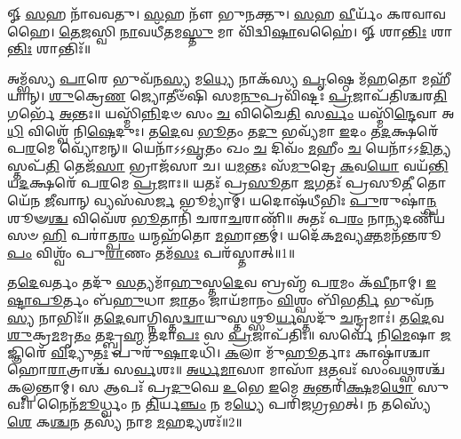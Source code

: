 \setcounter{anuvakam}{0}
𑍐 \ul{𑌸}\-𑌹 𑌨𑌾᳴𑌵𑌵𑌤𑍁। 
\-\ul{𑌸}\-𑌹 𑌨𑍗᳴ 𑌭𑍁𑌨𑌕𑍍𑌤𑍁। 
\-\ul{𑌸}\-𑌹 \ul{𑌵𑍀}\-𑌰𑍍𑌯𑌂᳴ 𑌕𑌰𑌵𑌾𑌵𑌹𑍈। 
\-\ul{𑌤𑍇}\-\-\ul{𑌜}\-𑌸𑍍𑌵𑌿 \ul{𑌨𑌾}\-𑌵𑌧𑍀᳴𑌤𑌮\-\ul{𑌸𑍍𑌤𑍁} 𑌮𑌾 𑌵𑌿᳴𑌦𑍍𑌵𑌿\-\ul{𑌷𑌾}\-𑌵𑌹𑍈॑। 
𑍐 𑌶𑌾\-\ul{𑌨𑍍𑌤𑌿𑌃} 𑌶𑌾\-\ul{𑌨𑍍𑌤𑌿𑌃} 𑌶𑌾𑌨𑍍𑌤𑌿𑌃᳴॥

𑌅𑌮𑍍𑌭᳴𑌸𑍍𑌯 \ul{𑌪𑌾}\-𑌰𑍇 𑌭𑍁𑌵᳴𑌨\-\ul{𑌸𑍍𑌯} 𑌮\-\ul{𑌧𑍍𑌯𑍇} 𑌨𑌾𑌕᳴𑌸𑍍𑌯 \ul{𑌪𑍃}\-𑌷𑍍𑌠𑍇 𑌮᳴\-\ul{𑌹}\-𑌤𑍋 𑌮𑌹𑍀᳴𑌯𑌾𑌨𑍍। 
\-\ul{𑌶𑍁}\-𑌕𑍍𑌰𑍇\-\ul{𑌣} 𑌜𑍍𑌯𑍋𑌤𑍀𑍞᳴𑌷𑌿 𑌸𑌮\-\ul{𑌨𑍁}\-𑌪𑍍𑌰𑌵𑌿᳴𑌷𑍍𑌟𑌃 \ul{𑌪𑍍𑌰}\-𑌜𑌾𑌪᳴𑌤𑌿𑌶𑍍𑌚𑌰\-\ul{𑌤𑌿} 𑌗𑌰𑍍𑌭𑍇᳴ \ul{𑌅}\-𑌨𑍍𑌤𑌃॥ 
𑌯𑌸𑍍𑌮𑌿᳴\-\ul{𑌨𑍍𑌨𑌿}\-𑌦𑍞 𑌸𑌂 \ul{𑌚} 𑌵𑌿𑌚𑍈\-\ul{𑌤𑌿} 𑌸\-\ul{𑌰𑍍𑌵𑌂} 𑌯𑌸𑍍𑌮𑌿᳴\-\ul{𑌨𑍍𑌦𑍇}\-𑌵𑌾 𑌅\-\ul{𑌧𑌿} 𑌵𑌿𑌶𑍍𑌵𑍇᳴ 𑌨𑌿\-\ul{𑌷𑍇}\-𑌦𑍁𑌃। 
𑌤\-\ul{𑌦𑍇}\-𑌵 \ul{𑌭𑍂}\-𑌤𑌂 𑌤\-\ul{𑌦𑍁} 𑌭𑌵𑍍𑌯᳴𑌮𑌾 \ul{𑌇}\-𑌦𑌂 𑌤\-\ul{𑌦}\-𑌕𑍍𑌷𑌰𑍇᳴ 𑌪\-\ul{𑌰}\-𑌮𑍇 𑌵𑍍𑌯𑍋᳴𑌮𑌨𑍍॥ 
𑌯𑍇𑌨𑌾᳴𑌽𑌽\-\ul{𑌵𑍃}\-𑌤𑌂 𑌖𑌂 \ul{𑌚} 𑌦𑌿𑌵𑌂᳴ \ul{𑌮}\-𑌹𑍀𑌂 \ul{𑌚} 𑌯𑍇𑌨𑌾᳴𑌽𑌽\-\ul{𑌦𑌿}\-𑌤𑍍𑌯𑌸𑍍𑌤𑌪᳴\-\ul{𑌤𑌿} 𑌤𑍇𑌜᳴\-\ul{𑌸𑌾} 𑌭𑍍𑌰𑌾𑌜᳴𑌸𑌾 𑌚। 
𑌯\-\ul{𑌮}\-𑌨𑍍𑌤𑌃 𑌸᳴\-\ul{𑌮𑍁}\-𑌦𑍍𑌰𑍇 \ul{𑌕}\-𑌵\-\ul{𑌯𑍋} 𑌵𑌯᳴\-\ul{𑌨𑍍𑌤𑌿} 𑌯\-\ul{𑌦}\-𑌕𑍍𑌷𑌰𑍇᳴ 𑌪\-\ul{𑌰}\-𑌮𑍇 \ul{𑌪𑍍𑌰}\-𑌜𑌾𑌃॥ 
𑌯𑌤𑌃᳴ 𑌪𑍍𑌰\-\ul{𑌸𑍂}\-𑌤𑌾 \ul{𑌜}\-𑌗𑌤𑌃᳴ 𑌪𑍍𑌰𑌸𑍂\-\ul{𑌤𑍀} 𑌤𑍋𑌯𑍇᳴𑌨 \ul{𑌜𑍀}\-𑌵𑌾𑌨𑍍 𑌵𑍍𑌯𑌸᳴𑌸\-\ul{𑌰𑍍𑌜} 𑌭𑍂𑌮𑍍𑌯𑌾॑𑌮𑍍। 
𑌯𑌦𑍋𑌷᳴𑌧𑍀𑌭𑌿𑌃 \ul{𑌪𑍁}\-𑌰𑍁𑌷𑌾॑\-\ul{𑌨𑍍𑌪}\-𑌶𑍂𑍟\-\ul{𑌶𑍍𑌚} 𑌵𑌿𑌵𑍇᳴𑌶 \ul{𑌭𑍂}\-𑌤𑌾𑌨𑌿᳴ 𑌚𑌰𑌾\-\ul{𑌚}\-𑌰𑌾𑌣𑌿᳴॥ 
𑌅𑌤𑌃᳴ 𑌪\-\ul{𑌰𑌂} 𑌨𑌾\-\ul{𑌨𑍍𑌯}\-𑌦𑌣𑍀᳴𑌯𑌸𑍞 \ul{𑌹𑌿} 𑌪𑌰𑌾॑𑌤𑍍𑌪\-\ul{𑌰𑌂} 𑌯𑌨𑍍𑌮𑌹᳴𑌤𑍋 \ul{𑌮}\-𑌹𑌾𑌨𑍍𑌤𑌮𑍍॑। 
𑌯𑌦𑍇᳴𑌕\-\ul{𑌮}\-𑌵𑍍𑌯\-\ul{𑌕𑍍𑌤}\-𑌮𑌨᳴𑌨𑍍𑌤𑌰𑍂\-\ul{𑌪𑌂} 𑌵𑌿𑌶𑍍𑌵𑌂᳴ 𑌪𑍁\-\ul{𑌰𑌾}\-𑌣𑌂 𑌤𑌮᳴\-\ul{𑌸𑌃} 𑌪𑌰᳴𑌸𑍍𑌤𑌾𑌤𑍍॥1॥

𑌤\-\ul{𑌦𑍇}\-𑌵𑌰𑍍𑌤𑌂 𑌤𑌦𑍁᳴ \ul{𑌸}\-𑌤𑍍𑌯𑌮𑌾᳴\-\ul{𑌹𑍁}\-𑌸𑍍𑌤\-\ul{𑌦𑍇}\-𑌵 𑌬𑍍𑌰𑌹𑍍𑌮᳴ 𑌪\-\ul{𑌰}\-𑌮𑌂 𑌕᳴\-\ul{𑌵𑍀}\-𑌨𑌾𑌮𑍍। 
\-\ul{𑌇}\-\-\ul{𑌷𑍍𑌟𑌾}\-\-\ul{𑌪𑍂}\-𑌰𑍍𑌤𑌂 𑌬᳴\-\ul{𑌹𑍁}\-𑌧𑌾 \ul{𑌜𑌾}\-𑌤𑌂 𑌜𑌾𑌯᳴𑌮𑌾𑌨𑌂 \ul{𑌵𑌿}\-𑌶𑍍𑌵𑌂 𑌬𑌿᳴𑌭\-\ul{𑌰𑍍𑌤𑌿} 𑌭𑍁𑌵᳴𑌨\-\ul{𑌸𑍍𑌯} 𑌨𑌾𑌭𑌿𑌃᳴॥ 
𑌤\-\ul{𑌦𑍇}\-𑌵𑌾𑌗𑍍𑌨𑌿𑌸𑍍𑌤\-\ul{𑌦𑍍𑌵𑌾}\-𑌯𑍁𑌸𑍍𑌤𑌥𑍍𑌸𑍂\-\ul{𑌰𑍍𑌯}\-𑌸𑍍𑌤𑌦𑍁᳴ \ul{𑌚}\-𑌨𑍍𑌦𑍍𑌰𑌮𑌾𑌃॑। 
𑌤\-\ul{𑌦𑍇}\-𑌵 \ul{𑌶𑍁}\-𑌕𑍍𑌰\-\ul{𑌮}\-𑌮𑍃\-\ul{𑌤𑌂} 𑌤𑌦𑍍𑌬𑍍𑌰\-\ul{𑌹𑍍𑌮} 𑌤𑌦𑌾\-\ul{𑌪𑌃} 𑌸 \ul{𑌪𑍍𑌰}\-𑌜𑌾𑌪᳴𑌤𑌿𑌃॥ 
𑌸𑌰𑍍𑌵𑍇᳴ 𑌨𑌿\-\ul{𑌮𑍇}\-𑌷𑌾 \ul{𑌜}\-𑌜𑍍𑌞𑌿𑌰𑍇᳴ \ul{𑌵𑌿}\-𑌦𑍍𑌯𑍁\-\ul{𑌤𑌃} 𑌪𑍁𑌰𑍁᳴\-\ul{𑌷𑌾}\-𑌦𑌧𑌿᳴। 
\-\ul{𑌕}\-𑌲𑌾 𑌮𑍁᳴\-\ul{𑌹𑍂}\-𑌰𑍍𑌤𑌾𑌃 𑌕𑌾𑌷𑍍𑌠𑌾॑𑌶𑍍𑌚𑌾𑌹𑍋\-\ul{𑌰𑌾}\-𑌤𑍍𑌰𑌾𑌶𑍍𑌚᳴ 𑌸\-\ul{𑌰𑍍𑌵}\-𑌶𑌃॥ 
\-\ul{𑌅}\-\-\ul{𑌰𑍍𑌧}\-\-\ul{𑌮𑌾}\-𑌸𑌾 𑌮𑌾𑌸𑌾᳴ \ul{𑌋}\-𑌤𑌵𑌃᳴ 𑌸𑌂𑌵\-\ul{𑌥𑍍𑌸}\-𑌰𑌶𑍍𑌚᳴ 𑌕𑌲𑍍𑌪𑌨𑍍𑌤𑌾𑌮𑍍। 
𑌸 𑌆𑌪𑌃᳴ 𑌪𑍍𑌰\-\ul{𑌦𑍁}\-𑌘𑍇 \ul{𑌉}\-𑌭𑍇 \ul{𑌇}\-𑌮𑍇 \ul{𑌅}\-𑌨𑍍𑌤𑌰𑌿᳴\-\ul{𑌕𑍍𑌷}\-𑌮\-\ul{𑌥𑍋} 𑌸𑍁𑌵𑌃᳴॥ 
𑌨𑍈𑌨᳴\-\ul{𑌮𑍂}\-𑌰𑍍𑌧𑍍𑌵𑌂 𑌨 \ul{𑌤𑌿}\-𑌰𑍍𑌯\-\ul{𑌞𑍍𑌚𑌂} 𑌨 𑌮\-\ul{𑌧𑍍𑌯𑍇} 𑌪𑌰𑌿᳴𑌜𑌗𑍍𑌰𑌭𑌤𑍍। 
𑌨 𑌤𑌸𑍍𑌯𑍇᳴\-\ul{𑌶𑍇} 𑌕\-\ul{𑌶𑍍𑌚}\-𑌨 𑌤𑌸𑍍𑌯᳴ 𑌨𑌾𑌮 \ul{𑌮}\-𑌹𑌦𑍍𑌯𑌶𑌃᳴॥2॥

